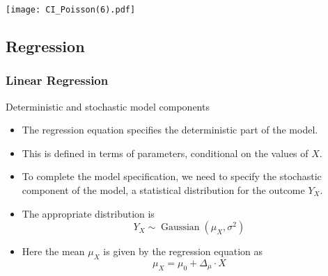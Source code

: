\documentclass[10pt,handout]{beamer}\usepackage[]{graphicx}\usepackage[]{color}
\begin{document}
\begin{frame}
	\centering
	\texttt{[image: CI\_Poisson(6).pdf]}
\end{frame}


\subsection{Regression}

\begin{frame}
\end{frame}

\subsubsection{Linear Regression}
\begin{frame}{Deterministic and stochastic model components}
	\begin{itemize}
		\item 
		The regression equation specifies the deterministic part of the model.
		
		\item This is defined in terms of parameters, conditional on the values of $X$.
		
		\item To complete the model specification, we need to specify the stochastic component of the model, a statistical distribution for the outcome $Y_{X}$. 
		\item The appropriate distribution is
		$$
		Y_{X} \sim \operatorname{Gaussian}\left(\mu_{X}, \sigma^2\right)
		$$
		\item Here the mean $\mu_{X}$ is given by the regression equation as 
		$$
		\mu_{X}=\mu_0 + \Delta_{\mu} \cdot X
		$$
	\end{itemize}
\end{frame}
\end{document}
